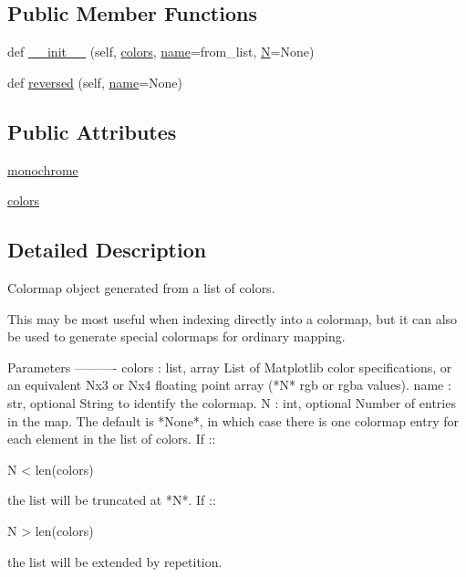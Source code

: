 \subsection*{Public Member Functions}
\begin{DoxyCompactItemize}
\item 
def \hyperlink{classmatplotlib_1_1colors_1_1ListedColormap_ac483ad0759a1da7ad3736ea90c599269}{\+\_\+\+\_\+init\+\_\+\+\_\+} (self, \hyperlink{classmatplotlib_1_1colors_1_1ListedColormap_a5b2b5608ce664672fd9a2da21ee3de3d}{colors}, \hyperlink{classmatplotlib_1_1colors_1_1Colormap_aa816ba9aebc8d8438ca791c82bb6198c}{name}=\textquotesingle{}from\+\_\+list\textquotesingle{}, \hyperlink{classmatplotlib_1_1colors_1_1Colormap_a011f75e2d28856dd18ada18febb2bb26}{N}=None)
\item 
def \hyperlink{classmatplotlib_1_1colors_1_1ListedColormap_aeabbbadac6c7784563dd2dd2896e9fef}{reversed} (self, \hyperlink{classmatplotlib_1_1colors_1_1Colormap_aa816ba9aebc8d8438ca791c82bb6198c}{name}=None)
\end{DoxyCompactItemize}
\subsection*{Public Attributes}
\begin{DoxyCompactItemize}
\item 
\hyperlink{classmatplotlib_1_1colors_1_1ListedColormap_a3c360f0c566a67e2836aa838e776ad48}{monochrome}
\item 
\hyperlink{classmatplotlib_1_1colors_1_1ListedColormap_a5b2b5608ce664672fd9a2da21ee3de3d}{colors}
\end{DoxyCompactItemize}


\subsection{Detailed Description}
\begin{DoxyVerb}Colormap object generated from a list of colors.

This may be most useful when indexing directly into a colormap,
but it can also be used to generate special colormaps for ordinary
mapping.

Parameters
----------
colors : list, array
    List of Matplotlib color specifications, or an equivalent Nx3 or Nx4
    floating point array (*N* rgb or rgba values).
name : str, optional
    String to identify the colormap.
N : int, optional
    Number of entries in the map. The default is *None*, in which case
    there is one colormap entry for each element in the list of colors.
    If ::

        N < len(colors)

    the list will be truncated at *N*. If ::

        N > len(colors)

    the list will be extended by repetition.
\end{DoxyVerb}
 


